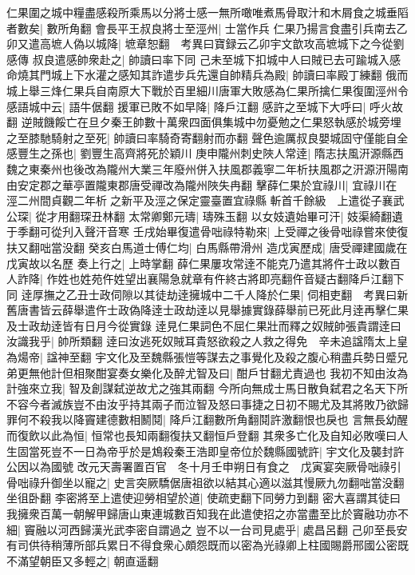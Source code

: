 仁果圍之城中糧盡感殺所乘馬以分將士感一無所噉唯煮馬骨取汁和木屑食之城垂䧟者數矣|{
	數所角翻}
會長平王叔良將士至涇州|{
	士當作兵}
仁果乃揚言食盡引兵南去乙卯又遣高墌人偽以城降|{
	墌章恕翻　考異曰寶録云乙卯宇文歆攻高墌城下之今從劉感傳}
叔良遣感帥衆赴之|{
	帥讀曰率下同}
己未至城下扣城中人曰賊已去可踰城入感命燒其門城上下水灌之感知其詐遣步兵先還自帥精兵為殿|{
	帥讀曰率殿丁練翻}
俄而城上舉三烽仁果兵自南原大下戰於百里細川唐軍大敗感為仁果所擒仁果復圍涇州令感語城中云|{
	語牛倨翻}
援軍已敗不如早降|{
	降戶江翻}
感許之至城下大呼曰|{
	呼火故翻}
逆賊饑餒亡在旦夕秦王帥數十萬衆四面俱集城中勿憂勉之仁果怒執感於城旁埋之至膝馳騎射之至死|{
	帥讀曰率騎奇寄翻射而亦翻}
聲色逾厲叔良嬰城固守僅能自全感豐生之孫也|{
	劉豐生高齊將死於穎川}
庚申隴州刺史陜人常逹|{
	隋志扶風汧源縣西魏之東秦州也後改為隴州大業三年廢州併入扶風郡義寧二年析扶風郡之汧源汧陽南由安定郡之華亭置隴東郡唐受禪改為隴州陜失冉翻}
擊薛仁果於宜祿川|{
	宜祿川在涇二州間貞觀二年析之新平及涇之保定靈臺置宜祿縣}
斬首千餘級　上遣從子襄武公琛|{
	從才用翻琛丑林翻}
太常卿鄭元璹|{
	璹殊玉翻}
以女妓遺始畢可汗|{
	妓渠綺翻遺于季翻可從刋入聲汗音寒}
壬戌始畢復遣骨咄祿特勒來|{
	上受禪之後骨咄祿嘗來使復扶又翻咄當没翻}
癸亥白馬道士傅仁均|{
	白馬縣帶滑州}
造戊寅歷成|{
	唐受禪建國歲在戊寅故以名歷}
奏上行之|{
	上時掌翻}
薛仁果屢攻常逹不能克乃遣其將仵士政以數百人詐降|{
	作姓也姓苑仵姓望出襄陽急就章有仵終古將即亮翻仵音疑古翻降戶江翻下同}
逹厚撫之乙丑士政伺隙以其徒劫逹擁城中二千人降於仁果|{
	伺相吏翻　考異曰新舊唐書皆云薛舉遣仵士政偽降逹士政劫逹以見舉據實錄薛舉前已死此月逹再擊仁果及士政劫逹皆有日月今從實錄}
逹見仁果詞色不屈仁果壯而釋之奴賊帥張貴謂逹曰汝識我乎|{
	帥所類翻}
逹曰汝逃死奴賊耳貴怒欲殺之人救之得免　辛未追諡隋太上皇為煬帝|{
	諡神至翻}
宇文化及至魏縣張愷等謀去之事覺化及殺之腹心稍盡兵勢日蹙兄弟更無他計但相聚酣宴奏女樂化及醉尤智及曰|{
	酣戶甘翻尤責過也}
我初不知由汝為計強來立我|{
	智及創謀弑逆故尤之強其兩翻}
今所向無成士馬日散負弑君之名天下所不容今者滅族豈不由汝乎持其兩子而泣智及怒曰事捷之日初不賜尤及其將敗乃欲歸罪何不殺我以降竇建德數相鬭鬩|{
	降戶江翻數所角翻鬩許激翻恨也戾也}
言無長幼醒而復飲以此為恒|{
	恒常也長知兩翻復扶又翻恒戶登翻}
其衆多亡化及自知必敗嘆曰人生固當死豈不一日為帝乎於是鴆殺秦王浩即皇帝位於魏縣國號許|{
	宇文化及襲封許公因以為國號}
改元天壽署置百官　冬十月壬申朔日有食之　戊寅宴突厥骨咄祿引骨咄祿升御坐以寵之|{
	史言突厥驕倨唐祖欲以結其心適以滋其慢厥九勿翻咄當没翻坐徂卧翻}
李密將至上遣使迎勞相望於道|{
	使疏吏翻下同勞力到翻}
密大喜謂其徒曰我擁衆百萬一朝解甲歸唐山東連城數百知我在此遣使招之亦當盡至比於竇融功亦不細|{
	竇融以河西歸漢光武李密自謂過之}
豈不以一台司見處乎|{
	處昌呂翻}
己卯至長安有司供待稍薄所部兵累日不得食衆心頗怨既而以密為光祿卿上柱國賜爵邢國公密既不滿望朝臣又多輕之|{
	朝直遥翻}
